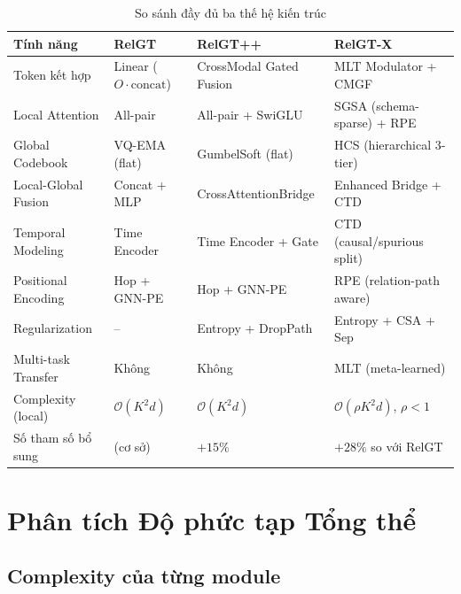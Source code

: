 \documentclass[12pt,a4paper]{article}
\begin{document}
\begin{table}[H]
\centering
\caption{So sánh đầy đủ ba thế hệ kiến trúc}
\renewcommand{\arraystretch}{1.3}
\begin{tabularx}{\textwidth}{lXXX}
\toprule
\textbf{Tính năng} & \textbf{RelGT} & \textbf{RelGT++} & \textbf{RelGT-X} \\
\midrule
Token kết hợp & Linear ($O \cdot \text{concat}$) & CrossModal Gated Fusion & MLT Modulator + CMGF \\
Local Attention & All-pair & All-pair + SwiGLU & SGSA (schema-sparse) + RPE \\
Global Codebook & VQ-EMA (flat) & GumbelSoft (flat) & HCS (hierarchical 3-tier) \\
Local-Global Fusion & Concat + MLP & CrossAttentionBridge & Enhanced Bridge + CTD \\
Temporal Modeling & Time Encoder & Time Encoder + Gate & CTD (causal/spurious split) \\
Positional Encoding & Hop + GNN-PE & Hop + GNN-PE & RPE (relation-path aware) \\
Regularization & -- & Entropy + DropPath & Entropy + CSA + Sep \\
Multi-task Transfer & Không & Không & MLT (meta-learned) \\
Complexity (local) & $\mathcal{O}(K^2 d)$ & $\mathcal{O}(K^2 d)$ & $\mathcal{O}(\rho K^2 d)$, $\rho < 1$ \\
Số tham số bổ sung & (cơ sở) & $+15\%$ & $+28\%$ so với RelGT \\
\bottomrule
\end{tabularx}
\end{table}

\section{Phân tích Độ phức tạp Tổng thể}

\subsection{Complexity của từng module}
\end{document}
